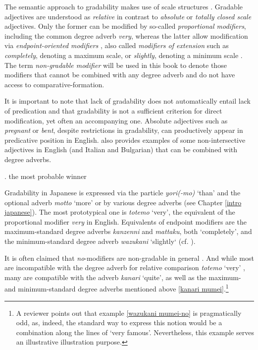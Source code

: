 \documentclass [output=book,colorlinks,citecolor=brown]{langscibook}
\begin{document}
The semantic approach to gradability makes use of scale structures \citep{kennedy:2005:scale, kennedy:2007:vagueness, morzycki:2012:adj}. Gradable adjectives are understood as \textit{relative} in contrast to \textit{absolute} or \textit{totally closed scale} adjectives. Only the former can be modified by so-called \textit{proportional modifiers}, including the common degree adverb \textit{very}, whereas the latter allow modification via \textit{endpoint-oriented modifiers} \citep{kennedy:2005:scale}, also called \textit{modifiers of extension} \citep{fabregas:2014:adjectival} such as \textit{completely}, denoting a maximum scale, or \textit{slightly}, denoting a minimum scale \citep[355]{kennedy:2005:scale}. The term \textit{non-gradable modifier} will be used in this book to denote those modifiers that cannot be combined with any degree adverb and do not have access to comparative-formation. %

It is important to note that lack of gradability does not automatically entail lack of predication and that gradability is not a sufficient criterion for direct modification, yet often an accompanying one. Absolute adjectives such as \textit{pregnant} or \textit{bent}, despite restrictions in gradability, can productively appear in predicative position in English. \citet{cinque:2010:adj} also provides examples of some non-intersective adjectives in English (and Italian and Bulgarian) that can be combined with degree adverbs.

\ex. the most probable winner \hfill \citep[47]{cinque:2010:adj}

Gradability in Japanese is expressed via the particle \textit{yori(-mo)} `than' and the optional adverb \textit{motto} `more' or by various degree adverbs (see Chapter \ref{intro japanese}). The most prototypical one is \textit{totemo} `very’, the equivalent of the proportional modifier \textit{very} in English. Equivalents of endpoint modifiers are the maximum-standard degree adverbs \textit{kanzenni} and \textit{mattaku}, both `completely’, and the minimum-standard degree adverb \textit{wazukani} `slightly‘ (cf. \citealt{oshima:2019:gradability}). %

It is often claimed that \textit{no}-modifiers are non-gradable in general \citep{kato:2003:nihongo, morita:2011:three, morita:2013:morph}. And while most are incompatible with the degree adverb for relative comparison \textit{totemo} `very’ , many are compatible with the adverb \textit{kanari} `quite’, as well as the maximum- and minimum-standard degree adverbs mentioned above \ref{kanari mumei}.\footnote{A reviewer points out that example \ref{wazukani mumei-no} is pragmatically odd, as, indeed, the standard way to express this notion would be a combination along the lines of `very famous'. Nevertheless, this example serves an illustrative illustration purpose.}%
\end{document}
